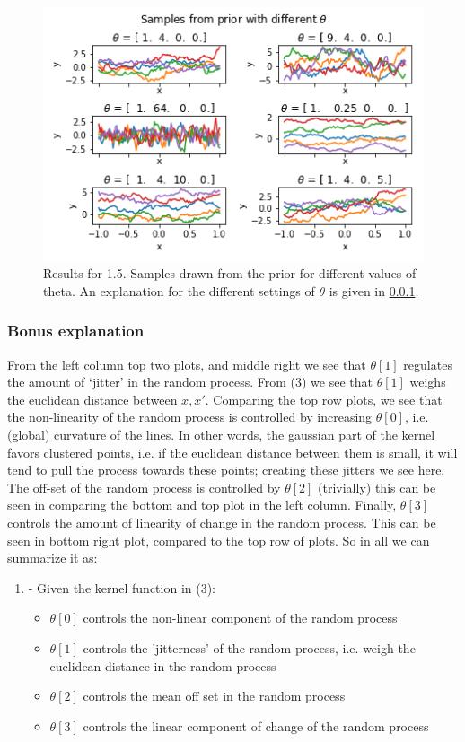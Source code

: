 \documentclass[11pt]{article}
\makeatletter
\def\maxwidth{\ifdim\Gin@nat@width>\linewidth\linewidth
    \else\Gin@nat@width\fi}
\let\Oldincludegraphics\includegraphics
\renewcommand{\includegraphics}[1]{\Oldincludegraphics[width=.8\maxwidth]{#1}}
\makeatother
\begin{document}
	\begin{figure}[H]
	\includegraphics{../Figures/1.5.png}
	\caption{Results for 1.5. Samples drawn from the prior for different values of theta. An explanation for the different settings of $\theta$ is given in \ref{bonus-explanation}.}
	\end{figure}

    \subsubsection{Bonus explanation}\label{bonus-explanation} 

From the left column top two plots, and middle right we see that
\(\theta[1]\) regulates the amount of `jitter' in the random process.
From (3) we see that \(\theta[1]\) weighs the euclidean distance between
\(x, x'\). Comparing the top row plots, we see that the non-linearity of
the random process is controlled by increasing \(\theta[0]\), i.e.
(global) curvature of the lines. In other words, the gaussian part of the kernel favors clustered points, i.e. if the euclidean distance between them is small, it will tend to pull the process towards these points; creating these jitters we see here.  The off-set of the random process is
controlled by \(\theta[2]\) (trivially) this can be seen in comparing
the bottom and top plot in the left column. Finally, \(\theta[3]\)
controls the amount of linearity of change in the random process. This
can be seen in bottom right plot, compared to the top row of plots. So
in all we can summarize it as:

\begin{enumerate}
  \item - Given the kernel function in (3):
  \begin{itemize}
  \item  $\theta[0]$ controls the non-linear component of the random process

  \item  $\theta[1]$ controls the 'jitterness' of the random process, i.e. weigh the euclidean distance in the random process

  \item $\theta[2]$ controls the mean off set in the random process

  \item $\theta[3]$ controls the linear component of change of the random process
  \end{itemize}
\end{enumerate}
\end{document}
